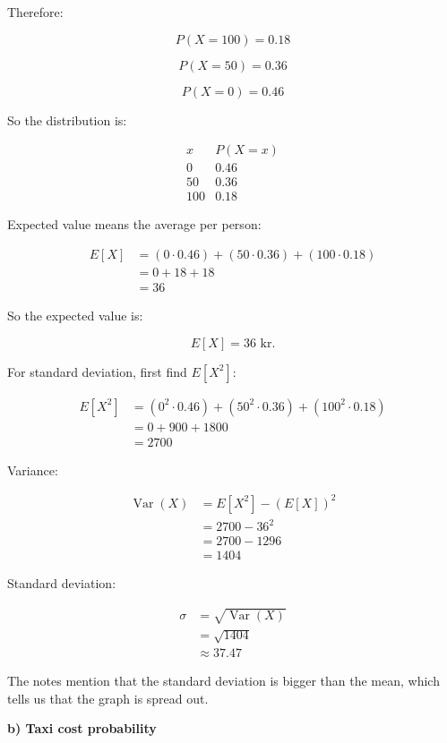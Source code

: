 \documentclass[10pt]{article}
\begin{document}
Therefore:

\[
P(X=100)=0.18
\]

\[
P(X=50)=0.36
\]

\[
P(X=0)=0.46
\]

So the distribution is:

\[
\begin{array}{c|c}
x & P(X=x)\\
\hline
0 & 0.46\\
50 & 0.36\\
100 & 0.18
\end{array}
\]

Expected value means the average per person:

\begin{align*}
E[X]
&=
(0\cdot 0.46)
+(50\cdot 0.36)
+(100\cdot 0.18) \\[2mm]
&=
0+18+18 \\[2mm]
&=36
\end{align*}

So the expected value is:

\[
E[X]=36\text{ kr}.
\]

For standard deviation, first find $E[X^2]$:

\begin{align*}
E[X^2]
&=
(0^2\cdot 0.46)
+(50^2\cdot 0.36)
+(100^2\cdot 0.18) \\[2mm]
&=
0+900+1800 \\[2mm]
&=2700
\end{align*}

Variance:

\begin{align*}
\operatorname{Var}(X)
&=
E[X^2]-(E[X])^2 \\[2mm]
&=
2700-36^2 \\[2mm]
&=
2700-1296 \\[2mm]
&=1404
\end{align*}

Standard deviation:

\begin{align*}
\sigma
&=
\sqrt{\operatorname{Var}(X)} \\[2mm]
&=
\sqrt{1404} \\[2mm]
&\approx 37.47
\end{align*}

The notes mention that the standard deviation is bigger than
the mean, which tells us that the graph is spread out.

\textbf{b) Taxi cost probability}
\end{document}
